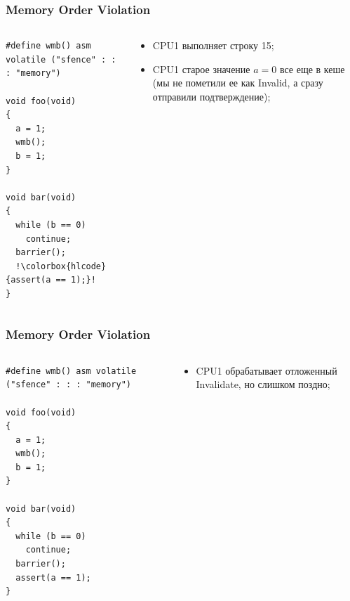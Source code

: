 \begin{frame}[fragile]
\frametitle{Memory Order Violation}

\begin{columns}[T]
  \begin{column}{.4\linewidth}
    \begin{lstlisting}[escapechar=!]
#define wmb() asm volatile ("sfence" : : : "memory")

void foo(void)
{
  a = 1;
  wmb();
  b = 1;
}

void bar(void)
{
  while (b == 0)
    continue;
  barrier();
  !\colorbox{hlcode}{assert(a == 1);}!
}
    \end{lstlisting}
  \end{column}
  \begin{column}{.6\linewidth}
    \begin{itemize}
      \item CPU1 выполняет строку 15;
      \item CPU1 старое значение $a = 0$ все еще в кеше (мы не пометили ее как
            Invalid, а сразу отправили подтверждение);
    \end{itemize}
  \end{column}
\end{columns}
\end{frame}

\begin{frame}[fragile]
\frametitle{Memory Order Violation}

\begin{columns}[T]
  \begin{column}{.4\linewidth}
    \begin{lstlisting}[escapechar=!]
#define wmb() asm volatile ("sfence" : : : "memory")

void foo(void)
{
  a = 1;
  wmb();
  b = 1;
}

void bar(void)
{
  while (b == 0)
    continue;
  barrier();
  assert(a == 1);
}
    \end{lstlisting}
  \end{column}
  \begin{column}{.6\linewidth}
    \begin{itemize}
      \item CPU1 обрабатывает отложенный Invalidate, но слишком поздно;
    \end{itemize}
  \end{column}
\end{columns}
\end{frame}

